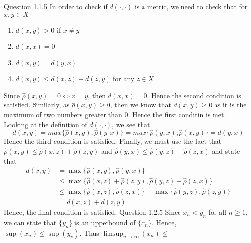 \documentclass[12pt]{exam}
\begin{document}
\begin{questions}
\question Question 1.1.5\newline 
In order to check if $d(\cdot, \cdot)$ is a metric, we need to check that for $x,y \in X$ \begin{enumerate}
    \item $d(x,y) > 0$ if $x \neq y$ 
    \item $d(x,x) = 0$
    \item $d(x,y) = d(y,x)$
    \item $d(x,y) \leq d(x,z) + d(z,y)$ for any $z\in X$
\end{enumerate}
Since $\hat{\rho}(x,y) = 0 \iff x = y$, then $d(x,x) = 0$. Hence the second condition is satisfied. Similarly, as $\hat{\rho}(x,y) \geq 0 $, then we know that $d(x,y) \geq 0$ as it is the maximum of two numbers greater than $0$. Hence the first conditin is met. Looking at the definition of $d(\cdot, \cdot)$, we see that \[d(x,y) = max\{\hat{\rho}(x,y), \hat{\rho}(y,x)\} = max\{\hat{\rho}(y,x), \hat{\rho}(x,y)\} = d(y,x)\] Hence the third condition is satisfied. Finally, we must use the fact that $\hat{\rho}(x,y) \leq \hat{\rho}(x,z)+ \hat{\rho}(z,y)$ and $\hat{\rho}(y,x) \leq \hat{\rho}(y,z)+ \hat{\rho}(z,x)$ and state that 
\begin{align*}
    d(x,y) &= \max\{\hat{\rho}(x,y), \hat{\rho}(y,x)\} \\
    &\leq \max\{\hat{\rho}(x,z) + \hat{\rho}(z,y), \hat{\rho}(y,z) + \hat{\rho}(z,x)\} \\
    &\leq \max\{\hat{\rho}(x,z), \hat{\rho}(z,x)\} + \max\{\hat{\rho}(y,z), \hat{\rho}(z,y)\} \\
    &= d(x,z) + d(z,y)
    \end{align*}
    Hence, the final condition is satisfied. 
\question Question 1.2.5\newline
Since $x_n < y_n$ for all $n\geq 1$, we can state that $\{y_n\}$ is an upperbound of $\{x_n\}$. Hence, $\sup{(x_n)} \leq \sup{(y_n)}$. Thus $\limsup_{n\to \infty}(x_n) \leq$
\end{questions}
\end{document}
